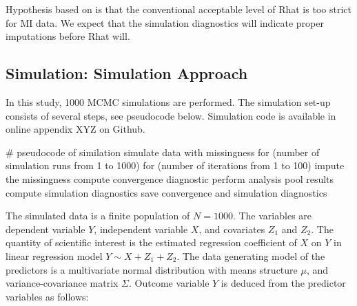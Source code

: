 \documentclass[article]{jss}
\begin{document}


Hypothesis based on \cite{lace07} is that the conventional acceptable level of Rhat is too strict for MI data. We expect that the simulation diagnostics will indicate proper imputations before Rhat will. 

\subsection{Simulation: Simulation Approach}

In this study, 1000 MCMC simulations are performed. The simulation set-up consists of several steps, see pseudocode below. Simulation code is available in online appendix XYZ on Github.

\begin{Code}
# pseudocode of similation 
simulate data with missingness
for (number of simulation runs from 1 to 1000)
  for (number of iterations from 1 to 100)
    impute the missingness
    compute convergence diagnostic
    perform analysis
    pool results
    compute simulation diagnostics
save convergence and simulation diagnostics
\end{Code}

The simulated data is a finite population of $N=1000$. The variables are dependent variable $Y$, independent variable $X$, and covariates $Z_1$ and $Z_2$. The quantity of scientific interest is the estimated regression coefficient of $X$ on $Y$ in linear regression model $Y \sim X+Z_1+Z_2$. The data generating model of the predictors is a multivariate normal distribution with means structure $\mu$, and variance-covariance matrix $\Sigma$. Outcome variable $Y$ is deduced from the predictor variables as follows:
\end{document}
